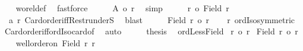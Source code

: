 \begin{isabellebody}
\ \ \isamarkupfalse%
\ wo{\isacharunderscore}{\kern0pt}rel{\isacharunderscore}{\kern0pt}def\ \isamarkupfalse%
\ fastforce\isanewline
\ \ \isamarkupfalse%
\ \isamarkupfalse%
\ {\isachardoublequoteopen}{\isacharbar}{\kern0pt}{\isacharquery}{\kern0pt}A{\isacharbar}{\kern0pt}\ {\isasymle}o\ {\isacharquery}{\kern0pt}r{\isacharprime}{\kern0pt}{\isachardoublequoteclose}\ \isamarkupfalse%
\ simp\isanewline
\ \ \isamarkupfalse%
\ \isamarkupfalse%
\ {\isachardoublequoteopen}{\isacharquery}{\kern0pt}r{\isacharprime}{\kern0pt}\ {\isacharless}{\kern0pt}o\ {\isacharbar}{\kern0pt}Field\ r{\isacharbar}{\kern0pt}{\isachardoublequoteclose}\isanewline
\ \ \isamarkupfalse%
\ {}\ a\ r\ Card{\isacharunderscore}{\kern0pt}order{\isacharunderscore}{\kern0pt}iff{\isacharunderscore}{\kern0pt}Restr{\isacharunderscore}{\kern0pt}underS\ \isamarkupfalse%
\ blast\isanewline
\ \ \isamarkupfalse%
\ \isamarkupfalse%
\ {\isachardoublequoteopen}{\isacharbar}{\kern0pt}Field\ r{\isacharbar}{\kern0pt}\ {\isacharequal}{\kern0pt}o\ r{\isachardoublequoteclose}\isanewline
\ \ \isamarkupfalse%
\ r\ ordIso{\isacharunderscore}{\kern0pt}symmetric\ \isamarkupfalse%
\ Card{\isacharunderscore}{\kern0pt}order{\isacharunderscore}{\kern0pt}iff{\isacharunderscore}{\kern0pt}ordIso{\isacharunderscore}{\kern0pt}card{\isacharunderscore}{\kern0pt}of\ \isamarkupfalse%
\ auto\isanewline
\ \ \isamarkupfalse%
\ \isamarkupfalse%
\ {\isacharquery}{\kern0pt}thesis\ \isacommand{{\isachardot}{\kern0pt}}\isamarkupfalse%
\isanewline
{}\isamarkupfalse%
%
\endisatagproof
{\isafoldproof}%
%
\isadelimproof
\isanewline
%
\endisadelimproof
\isanewline
{}\isamarkupfalse%
\ ordLess{\isacharunderscore}{\kern0pt}Field{\isacharcolon}{\kern0pt}\isanewline
{}\ {\isachardoublequoteopen}r\ {\isacharless}{\kern0pt}o\ r{\isacharprime}{\kern0pt}{\isachardoublequoteclose}\isanewline
{}\ {\isachardoublequoteopen}{\isacharbar}{\kern0pt}Field\ r{\isacharbar}{\kern0pt}\ {\isacharless}{\kern0pt}o\ r{\isacharprime}{\kern0pt}{\isachardoublequoteclose}\isanewline
%
\isadelimproof
%
\endisadelimproof
%
\isatagproof
{}\isamarkupfalse%
{\isacharminus}{\kern0pt}\isanewline
\ \ \isamarkupfalse%
\ {\isachardoublequoteopen}well{\isacharunderscore}{\kern0pt}order{\isacharunderscore}{\kern0pt}on\ {\isacharparenleft}{\kern0pt}Field\ r{\isacharparenright}{\kern0pt}\ r{\isachardoublequoteclose}\ \isamarkupfalse%

\end{isabellebody}
